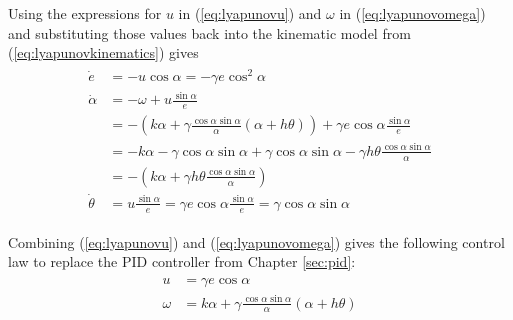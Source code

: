 Using the expressions for $u$ in (\ref{eq:lyapunovu}) and $\omega$ in (\ref{eq:lyapunovomega}) and substituting those values back into the kinematic model from (\ref{eq:lyapunovkinematics}) gives
\begin{align}
\label{eq:lyapunovfinalkinematics}
\begin{split}
\dot{e} &= -u\cos\alpha = -\gamma e\cos^2\alpha \\
\dot{\alpha} &= -\omega + u\frac{\sin\alpha}{e} \\
&= -(k\alpha+\gamma\frac{\cos\alpha\sin\alpha}{\alpha}(\alpha+h\theta))+\gamma e\cos\alpha\frac{\sin\alpha}{e} \\
&= -k\alpha-\gamma\cos\alpha\sin\alpha+\gamma\cos\alpha\sin\alpha-\gamma h\theta\frac{\cos\alpha\sin\alpha}{\alpha} \\
&= -\left(k\alpha + \gamma h\theta\frac{\cos\alpha\sin\alpha}{\alpha}\right) \\
\dot{\theta} &= u\frac{\sin\alpha}{e} = \gamma e\cos\alpha\frac{\sin\alpha}{e} = \gamma\cos\alpha\sin\alpha
\end{split}
\end{align}

Combining (\ref{eq:lyapunovu}) and (\ref{eq:lyapunovomega}) gives the following control law to replace the PID controller from Chapter \ref{sec:pid}:
\begin{align}
\label{eq:lyapunovControlLaw}
\begin{split}
u &= \gamma e\cos\alpha \\
\omega &= k\alpha + \gamma\frac{\cos\alpha\sin\alpha}{\alpha}\left(\alpha+h\theta\right)
\end{split}
\end{align}


